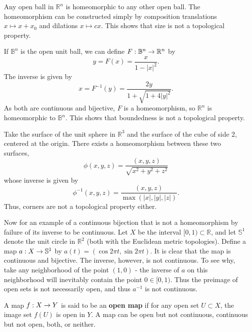 \documentclass{mathnotes}
\begin{document}
\begin{exmp}
    Any open ball in $\mathbb{R}^n$ is homeomorphic to any other open ball. The homeomorphism can be constructed simply by
    composition translations $x\mapsto x+x_0$ and dilations $x\mapsto cx$. This shows that size is not a topological property.
\end{exmp}

\begin{exmp}
    If $\mathbb{B}^n$ is the open unit ball, we can define $F:\mathbb{B}^n\rightarrow \mathbb{R}^n$ by
    \[y=F(x)=\frac{x}{1-|x|^2}.\]
    The inverse is given by
    \[x=F^{-1}(y)=\frac{2y}{1+\sqrt{1+4|y|^2}}.\]
    As both are continuous and bijective, $F$ is a homeomorphism, so $\mathbb{R}^n$ is homeomorphic to $\mathbb{B}^n$. This
    shows that boundedness is not a topological property.
\end{exmp}

\begin{exmp}
    Take the surface of the unit sphere in $\mathbb{R}^3$ and the surface of the cube of side 2, centered at the origin. There exists
    a homeomorphism between these two surfaces,
    \[\phi(x,y,z)=\frac{(x,y,z)}{\sqrt{x^2+y^2+z^2}}\]
    whose inverse is given by
    \[\phi^{-1}(x,y,z)=\frac{(x,y,z)}{\max(|x|,|y|,|z|)}.\]
    Thus, corners are not a topological property either.
\end{exmp}

\begin{exmp}
    Now for an example of a continuous bijection that is not a homeomorphism by failure of its inverse to be continuous.
    Let $X$ be the interval $[0,1)\subset \mathbb{R}$, and let $\mathbb{S}^1$ denote the unit circle in $\mathbb{R}^2$
    (both with the Euclidean metric topologies). Define a map $a:X\rightarrow \mathbb{S}^1$ by $a(t)=(\cos 2\pi t, \sin 2\pi t)$.
    It is clear that the map is continuous and bijective. The inverse, however, is not continuous. To see why, take any
    neighborhood of the point $(1,0)$ - the inverse of $a$ on this neighborhood will inevitably contain the point $0\in[0,1).$
    Thus the preimage of open sets is not necessarily open, and thus $a^{-1}$ is not continuous.
\end{exmp}

\begin{defn}
    A map $f:X\rightarrow Y$ is said to be an \textbf{open map} if for any open set $U\subset X$, the image set $f(U)$ is open in $Y$.
    A map can be open but not continuous, continuous but not open, both, or neither.
\end{defn}
\end{document}
